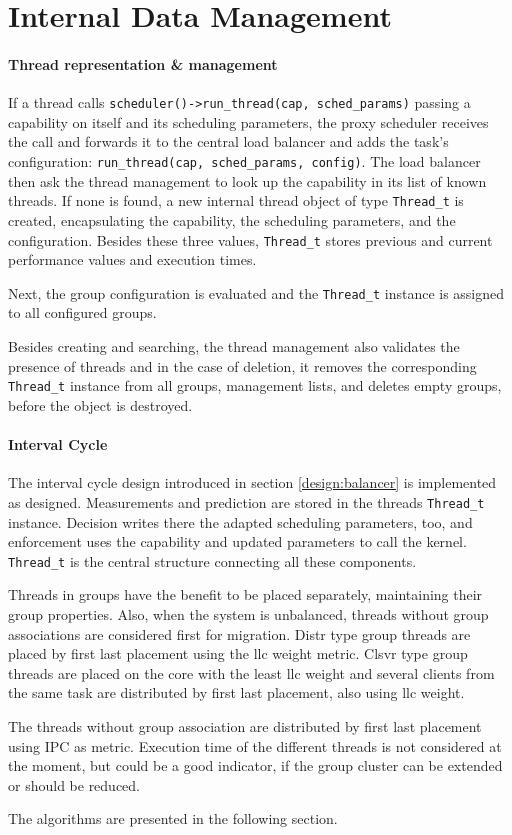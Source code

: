 \section{Internal Data Management}
\label{impl:internal}

\paragraph{Thread representation \& management}
If a thread calls \texttt{scheduler()->run\_thread(cap, sched\_params)} passing
a capability on itself and its scheduling parameters, the proxy scheduler
receives the call and forwards it to the central load balancer and adds the
task's configuration: \texttt{run\_thread(cap, sched\_params, config)}.
The load balancer then ask the thread management to look up the capability in
its list of known threads.
If none is found, a new internal thread object of type \texttt{Thread\_t} is
created, encapsulating the capability, the scheduling parameters, and the
configuration.
Besides these three values, \texttt{Thread\_t} stores previous and current
performance values and execution times.

Next, the group configuration is evaluated and the \texttt{Thread\_t} instance
is assigned to all configured groups.

Besides creating and searching, the thread management also validates the
presence of threads and in the case of deletion, it removes the corresponding
\texttt{Thread\_t} instance from all groups, management lists, and deletes empty
groups, before the object is destroyed.


\paragraph{Interval Cycle}
The interval cycle design introduced in section \ref{design:balancer} is
implemented as designed.
Measurements and prediction are stored in the threads \texttt{Thread\_t}
instance.
Decision writes there the adapted scheduling parameters, too, and enforcement
uses the capability and updated parameters to call the kernel.
\texttt{Thread\_t} is the central structure connecting all these components.

Threads in groups have the benefit to be placed separately, maintaining their
group properties.
Also, when the system is unbalanced, threads without group associations are
considered first for migration.
Distr type group threads are placed by first last placement using the \gls{llc}
weight metric.
Clsvr type group threads are placed on the core with the least \gls{llc} weight
and several clients from the same task are distributed by first last placement,
also using \gls{llc} weight.

The threads without group association are distributed by first last placement
using IPC as metric.
Execution time of the different threads is not considered at the moment, but
could be a good indicator, if the group cluster can be extended or should be
reduced.

The algorithms are presented in the following section.
